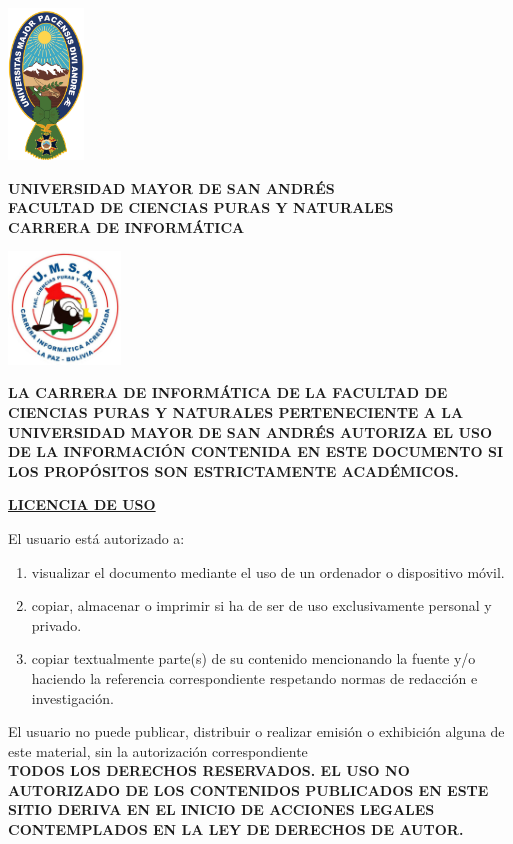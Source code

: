 \newpage
\thispagestyle{plain}

\begin{center}
	\begin{minipage}{0.2\textwidth}
		\centering
		\includegraphics[width=2cm]{imagenes/Logo_UMSA.png} %
	\end{minipage}%
	\begin{minipage}{0.6\textwidth}
		\centering
		\textbf{UNIVERSIDAD MAYOR DE SAN ANDRÉS}\\
		\textbf{FACULTAD DE CIENCIAS PURAS Y NATURALES}\\
		\textbf{CARRERA DE INFORMÁTICA}
	\end{minipage}%
	\begin{minipage}{0.2\textwidth}
		\centering
		\includegraphics[width=3cm]{imagenes/Logo_infor.png} %
	\end{minipage}
\end{center}

\vspace{1cm}

\textbf{LA CARRERA DE INFORMÁTICA DE LA FACULTAD DE CIENCIAS PURAS Y NATURALES PERTENECIENTE A LA UNIVERSIDAD MAYOR DE SAN ANDRÉS AUTORIZA EL USO DE LA INFORMACIÓN CONTENIDA EN ESTE DOCUMENTO SI LOS PROPÓSITOS SON ESTRICTAMENTE ACADÉMICOS.}\\

\begin{center}	
	\textbf{\underline{LICENCIA DE USO}}\\
\end{center}


El usuario está autorizado a:
\begin{enumerate}[label=\alph*)]
	\item visualizar el documento mediante el uso de un ordenador o dispositivo móvil.
	\item copiar, almacenar o imprimir si ha de ser de uso exclusivamente personal y privado.
	\item copiar textualmente parte(s) de su contenido mencionando la fuente y/o haciendo la referencia correspondiente respetando normas de redacción e investigación.
\end{enumerate}
El usuario no puede publicar, distribuir o realizar emisión o exhibición alguna de este material, sin la autorización correspondiente\\


\textbf{TODOS LOS DERECHOS RESERVADOS. EL USO NO AUTORIZADO DE LOS CONTENIDOS PUBLICADOS EN ESTE SITIO DERIVA EN EL INICIO DE ACCIONES LEGALES CONTEMPLADOS EN LA LEY DE DERECHOS DE AUTOR.}
